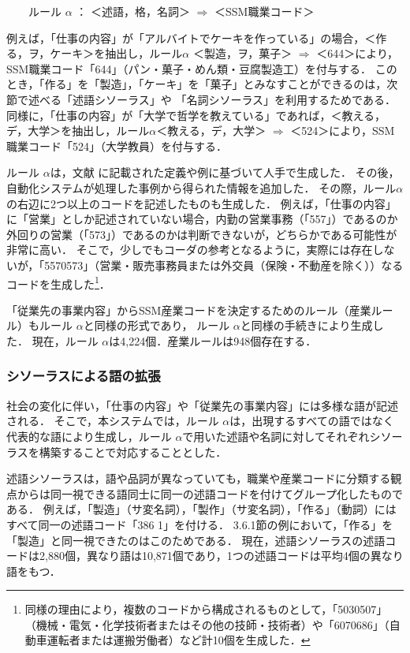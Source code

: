 \documentclass[japanese]{jnlp_1.4}
\begin{document}
\vspace{1\Cvs}
　　ルール $\alpha$ ： ＜述語，格，名詞＞ $\Rightarrow$ ＜SSM職業コード＞
\vspace{1\Cvs}

例えば，「仕事の内容」が「アルバイトでケーキを作っている」の場合，＜作る，ヲ，ケーキ＞を抽出し，ルール$\alpha$ ＜製造，ヲ，菓子＞ $\Rightarrow$ ＜644＞により，SSM職業コード「644」（パン・菓子・めん類・豆腐製造工）を付与する．
このとき，「作る」を「製造」，「ケーキ」を「菓子」とみなすことができるのは，次節で述べる「述語シソーラス」や 「名詞シソーラス」を利用するためである．
同様に，「仕事の内容」が「大学で哲学を教えている」であれば，＜教える，デ，大学＞を抽出し，ルール$\alpha$＜教える，デ，大学＞ $\Rightarrow$ ＜524＞により，SSM職業コード「524」（大学教員）を付与する．

ルール $\alpha$は，文献 \cite{SSM95}に記載された定義や例に基づいて人手で生成した． 
その後，自動化システムが処理した事例から得られた情報を追加した．
その際，ルール$\alpha$の右辺に2つ以上のコードを記述したものも生成した．  
例えば，「仕事の内容」に「営業」としか記述されていない場合，内勤の営業事務（「557」）であるのか外回りの営業（「573」）であるのかは判断できないが，どちらかである可能性が非常に高い．
そこで，少しでもコーダの参考となるように，実際には存在しないが，「5570573」（営業・販売事務員または外交員（保険・不動産を除く））なるコードを生成した\footnote{同様の理由により，複数のコードから構成されるものとして，「5030507」（機械・電気・化学技術者またはその他の技師・技術者）や「6070686」（自動車運転者または運搬労働者）など計10個を生成した．}．

 「従業先の事業内容」からSSM産業コードを決定するためのルール（産業ルール）もルール $\alpha$と同様の形式であり， ルール $\alpha$と同様の手続きにより生成した．
現在，ルール $\alpha$は4,224個．産業ルールは948個存在する．


\subsubsection{シソーラスによる語の拡張}

社会の変化に伴い，「仕事の内容」や「従業先の事業内容」には多様な語が記述される． 
そこで，本システムでは，ルール $\alpha$は，出現するすべての語ではなく代表的な語により生成し，ルール $\alpha$で用いた述語や名詞に対してそれぞれシソーラスを構築することで対応することとした．

述語シソーラスは，語や品詞が異なっていても，職業や産業コードに分類する観点からは同一視できる語同士に同一の述語コードを付けてグループ化したものである．
例えば，「製造」（サ変名詞），「製作」（サ変名詞），「作る」（動詞）にはすべて同一の述語コード「386 1」を付ける．
3.6.1節の例において，「作る」を「製造」と同一視できたのはこのためである．
現在，述語シソーラスの述語コードは2,880個，異なり語は10,871個であり，1つの述語コードは平均4個の異なり語をもつ．
 
\end{document}
